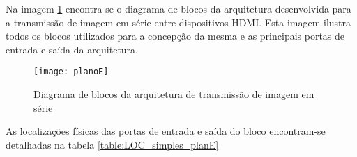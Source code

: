 Na imagem \ref{fig:planoE} encontra-se o diagrama de blocos da arquitetura desenvolvida para a transmissão de imagem em série entre dispositivos HDMI. Esta imagem ilustra todos os blocos utilizados para a concepção da mesma e as principais portas de entrada e saída da arquitetura. 

\begin{figure}[h!]
	\begin{center}
		\leavevmode
		\texttt{[image: planoE]}
		\captionsetup{width=1.0\linewidth}
		\caption[Diagrama de blocos da arquitetura de transmissão de imagem em série]{Diagrama de blocos da arquitetura de transmissão de imagem em série}
		\label{fig:planoE}
	\end{center}
\end{figure}

As localizações físicas das portas de entrada e saída do bloco encontram-se detalhadas na tabela \ref{table:LOC_simples_planE}

